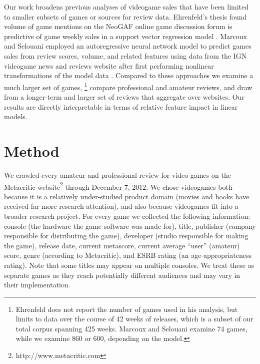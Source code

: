 \documentclass[letterpaper]{article}
\begin{document}
Our work broadens previous analyses of videogame sales that have been limited to smaller subsets of games or sources for review data. Ehrenfeld's thesis found volume of game mentions on the NeoGAF online game discussion forum is predictive of game weekly sales in a support vector regression model \cite{ehrenfeld2011predicting}. Marcoux and Selouani employed an autoregressive neural network model to predict games sales from review scores, volume, and related features using data from the IGN videogame news and reviews website after first performing nonlinear transformations of the model data \cite{marcoux2009hybrid}.
Compared to these approaches we examine a much larger set of games,
\footnote{Ehrenfeld does not report the number of games used in his analysis, but limits to data over the course of 42 weeks of releases, which is a subset of our total corpus spanning 425 weeks. Marcoux and Selouani examine 74 games, while we examine 860 or 600, depending on the model.}
compare professional and amateur reviews, and draw from a longer-term and larger set of reviews that aggregate over websites. Our results are directly interpretable in terms of relative feature impact in linear models.


\section{Method}

We crawled every amateur and professional review for video-games on the
Metacritic website\footnote{http://www.metacritic.com} through December
7, 2012. We chose videogames both because it is a relatively
under-studied product domain (movies and books have received far more
research attention), and also because videogames fit into a broader
research project. 
For every game we collected the following information: console (the
hardware the game software was made for), title, publisher (company
responsible for distributing the game), developer (studio responsible
for making the game), release date, current metascore, current average
``user'' (amateur) score, genre (according to Metacritic), and ESRB
rating (an age-appropriateness rating). Note that some titles may appear on multiple consoles. We treat these as separate games as they reach potentially different audiences and may vary in their implementation. 
\end{document}
